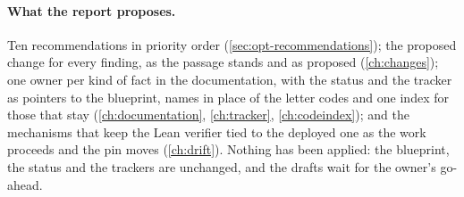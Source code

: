 \paragraph{What the report proposes.} Ten recommendations in priority order
(\cref{sec:opt-recommendations}); the proposed change for every finding, as the passage stands
and as proposed (\cref{ch:changes}); one owner per kind of fact in the documentation, with the
status and the tracker as pointers to the blueprint, names in place of the letter codes and one
index for those that stay (\cref{ch:documentation}, \cref{ch:tracker}, \cref{ch:codeindex});
and the mechanisms that keep the Lean verifier tied to the deployed one as the work proceeds
and the pin moves (\cref{ch:drift}). Nothing has been applied: the blueprint, the status and
the trackers are unchanged, and the drafts wait for the owner's go-ahead.
